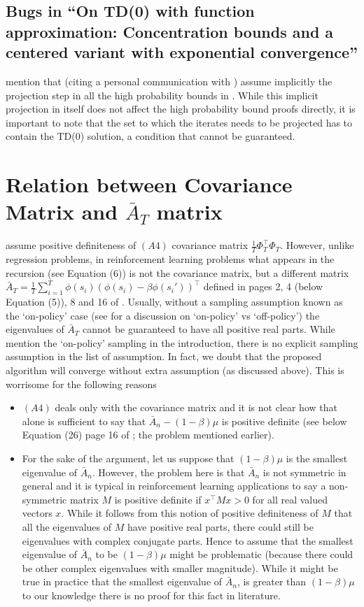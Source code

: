 \documentclass{article}
\begin{document}
\subsection{Bugs in ``On TD(0) with function approximation: Concentration bounds and a centered variant with exponential convergence''}
\citet{gugan} mention that (citing a personal communication with \citet{lstdicmla}) \cite{lstdicmla} assume implicitly the projection step in all the high probability bounds in \cite{lstdicmla}. While this implicit projection in itself does not affect the high probability bound proofs directly, it is important to note that the set to which the iterates needs to be projected has to contain the TD(0) solution, a condition that cannot be guaranteed.

\section{Relation between Covariance Matrix and $\bar{A}_T$ matrix}
\citet{flstda} assume positive definiteness of \textbf{$(A4)$} covariance matrix $\frac{1}{T}\Phi^\top_T \Phi_T$. However, unlike regression problems, in reinforcement learning problems what appears in the recursion (see Equation (6)) is not the covariance matrix, but a different matrix $\bar{A}_T=\frac{1}{T}\sum_{i=1}^T \phi(s_i)(\phi(s_i)-\beta\phi(s_i'))^\top$ defined in pages 2, 4 (below Equation (5)), 8 and 16 of \cite{flstda}. Usually, without a sampling assumption known as the `on-policy' case (see \cite{gtd} for a discussion on `on-policy' vs `off-policy') the eigenvalues of $\bar{A}_T$ cannot be guaranteed to have all positive real parts. While \citet{flstda} mention the `on-policy' sampling in the introduction, there is no explicit sampling assumption in the list of assumption. In fact, we doubt that the proposed algorithm will converge without extra assumption (as discussed above).
This is worrisome for the following reasons
\begin{itemize}
\item \textbf{$(A4)$} deals only with the covariance matrix and it is not clear how that alone is sufficient to say that $\bar{A}_n-(1-\beta)\mu$ is positive definite (see below Equation (26) page 16 of \cite{flstda}; the problem mentioned earlier).
\item For the sake of the argument, let us suppose that $(1-\beta)\mu$ is the smallest eigenvalue of $\bar{A}_n$. However, the problem here is that $\bar{A}_n$ is not symmetric in general and it is typical in reinforcement learning applications to say a non-symmetric matrix $M$ is positive definite if $x^\top M x>0$ for all real valued vectors $x$. While it follows from this notion of positive definiteness of $M$ that all the eigenvalues of $M$ have positive real parts, there could still be eigenvalues with complex conjugate parts. Hence to assume that the smallest eigenvalue of $\bar{A}_n$ to be $(1-\beta)\mu$ might be problematic (because there could be other complex eigenvalues with smaller magnitude). While it might be true in practice that the smallest eigenvalue of $\bar{A}_n$, is greater than $(1-\beta)\mu$ to our knowledge there is no proof for this fact in literature.
\end{itemize}
\fi
\end{document}
